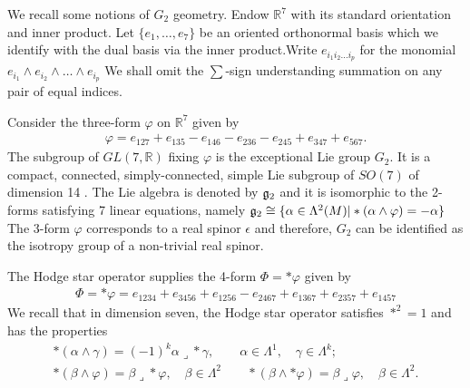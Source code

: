 \documentclass[10pt,british]{article}
\def\p{{\varphi}}
\def\ph{{\Phi}}
\begin{document}
 

 

We recall some notions of $G_2$ geometry. Endow $\mathbb R^7$ with its standard orientation and
inner product. Let $\{e_1,\dots,e_7\}$ be an oriented orthonormal basis which we identify with
the dual basis via the inner product.Write $e_{i_1 i_2\dots i_p}$ for the
monomial $e_{i_1} \wedge e_{i_2} \wedge \dots \wedge e_{i_p}$
We shall omit the $\sum$-sign understanding summation on any pair of equal indices.

Consider the three-form $\p$ on $\mathbb R^7$ given by
\begin{equation}\label{g2}
\begin{split}
\p=e_{127}+e_{135}-e_{146}-e_{236}-e_{245}+e_{347}+e_{567}.
\end{split}
\end{equation}
The subgroup of $GL(7,\mathbb R)$ fixing $\p$ is the exceptional Lie group $G_2$. It is a compact,
connected, simply-connected, simple Lie subgroup of $SO(7)$ of dimension 14 \cite{Br}.  The Lie algebra is denoted by 
 $\frak{g}_2$ and it is isomorphic to the 2-forms satisfying 7 linear equations, namely
 $\frak{g}_2\cong  \{\alpha\in \Lambda^2(M) \vert
  *(\alpha\wedge\p) =- \alpha\}$
The 3-form
$\p$ corresponds to a real spinor $\epsilon$ and therefore,
$G_2$ can be identified as the isotropy group of a non-trivial
real spinor.

The Hodge star operator supplies the 4-form $\ph=*\p$ given by
\begin{equation*}%
\begin{split}
\ph=*\p=e_{1234}+e_{3456}+e_{1256}-e_{2467}+e_{1367}+e_{2357}+e_{1457}
\end{split}
\end{equation*}
We recall that in dimension seven, the Hodge star operator satisfies $*^2=1$  and has the properties
\begin{equation}\label{star}
\begin{split}
*(\alpha\wedge\gamma)=(-1)^k\alpha\lrcorner *\gamma, \qquad \alpha\in \Lambda^1, \quad \gamma\in \Lambda^k;\\
*(\beta\wedge\p)=\beta\lrcorner *\p, \quad \beta\in \Lambda^2\qquad 
*(\beta\wedge *\p)=\beta\lrcorner \p, \quad \beta\in \Lambda^2.
\end{split}
\end{equation}
\end{document}
